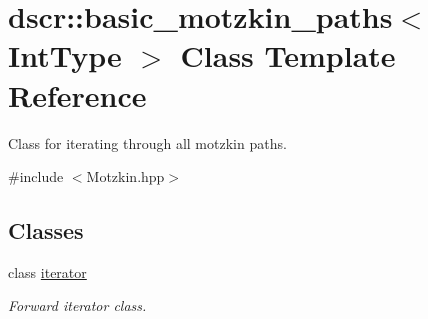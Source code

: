 \hypertarget{classdscr_1_1basic__motzkin__paths}{\section{dscr\-:\-:basic\-\_\-motzkin\-\_\-paths$<$ Int\-Type $>$ Class Template Reference}
\label{classdscr_1_1basic__motzkin__paths}
}


Class for iterating through all motzkin paths.  




{\ttfamily \#include $<$Motzkin.\-hpp$>$}

\subsection*{Classes}
\begin{DoxyCompactItemize}
\item 
class \hyperlink{classdscr_1_1basic__motzkin__paths_1_1iterator}{iterator}
\begin{DoxyCompactList}\small\item\em Forward iterator class. \end{DoxyCompactList}\end{DoxyCompactItemize}
